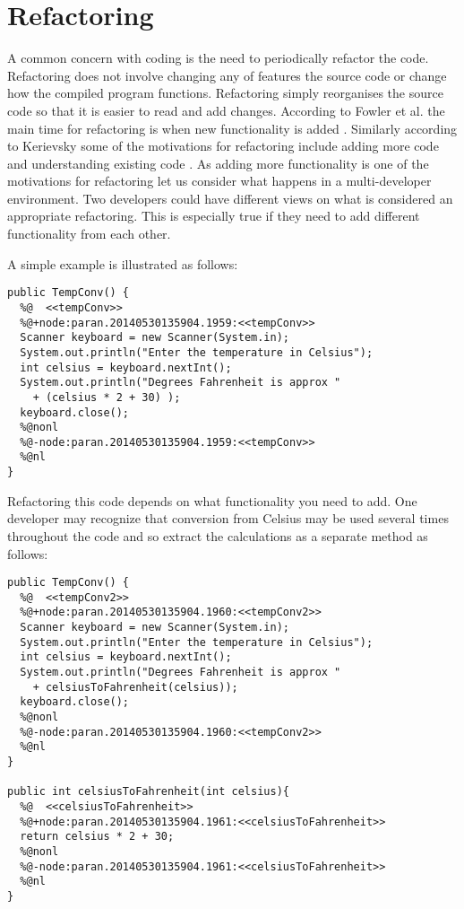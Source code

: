 
\section{Refactoring}

A common concern with coding is the need to periodically refactor the code. Refactoring does not involve changing any of features the source code or change how the compiled program functions. Refactoring simply reorganises the source code so that it is easier to read and add changes. According to Fowler et al. the main time for refactoring is when new functionality is added \cite{Fowler1999}. Similarly according to Kerievsky some of the motivations for refactoring include adding more code and understanding existing code \cite{Kerievsky2004}. As adding more functionality is one of the motivations for refactoring let us consider what happens in a multi-developer environment. Two developers could have different views on what is considered an appropriate refactoring. This is especially true if they need to add different functionality from each other. 

A simple example is illustrated as follows:

\begin{lstlisting}
public TempConv() {
  %@  <<tempConv>>
  %@+node:paran.20140530135904.1959:<<tempConv>>
  Scanner keyboard = new Scanner(System.in);
  System.out.println("Enter the temperature in Celsius");
  int celsius = keyboard.nextInt();
  System.out.println("Degrees Fahrenheit is approx " 
    + (celsius * 2 + 30) );
  keyboard.close();
  %@nonl
  %@-node:paran.20140530135904.1959:<<tempConv>>
  %@nl
}
\end{lstlisting}

Refactoring this code depends on what functionality you need to add. One developer may recognize that conversion from Celsius may be used several times throughout the code and so extract the calculations as a separate method as follows:

\begin{lstlisting}
public TempConv() {
  %@  <<tempConv2>>
  %@+node:paran.20140530135904.1960:<<tempConv2>>
  Scanner keyboard = new Scanner(System.in);
  System.out.println("Enter the temperature in Celsius");
  int celsius = keyboard.nextInt();
  System.out.println("Degrees Fahrenheit is approx " 
    + celsiusToFahrenheit(celsius));
  keyboard.close();
  %@nonl
  %@-node:paran.20140530135904.1960:<<tempConv2>>
  %@nl
}

public int celsiusToFahrenheit(int celsius){
  %@  <<celsiusToFahrenheit>>
  %@+node:paran.20140530135904.1961:<<celsiusToFahrenheit>>
  return celsius * 2 + 30;
  %@nonl
  %@-node:paran.20140530135904.1961:<<celsiusToFahrenheit>>
  %@nl
}
\end{lstlisting}

